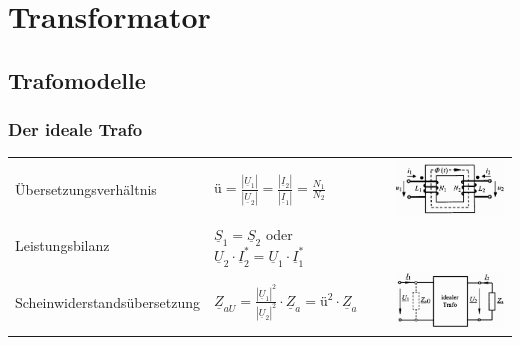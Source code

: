 \section{Transformator}
		
	\subsection{Trafomodelle}
		\subsubsection{Der ideale Trafo}
			\begin{tabular}{p{7cm}p{4.5cm}p{5cm}}
				Übersetzungsverh\"altnis &
					$\text{ü} = \frac{|\underline{U}_1|}{|\underline{U}_2|} =
					\frac{|\underline{I}_2|}{|\underline{I}_1|} = \frac{N_1}{N_2}$ &
					\begin{minipage}{4.5cm}
						\includegraphics[width=3.5cm]{bilder/GrundstruckturTrafo.png}
					\end{minipage} \\
				Leistungsbilanz &
					$\underline{S}_1 = \underline{S}_2$ 
					oder $\underline{U}_2 \cdot \underline{I}_2^* = \underline{U}_1 \cdot \underline{I}_1^*$ \\
				Scheinwiderstandsübersetzung &
					$\underline{Z}_{aU} = \frac{|\underline{U}_1|^2}{|\underline{U}_2|^2} \cdot \underline{Z}_a = \text{ü}^2 \cdot \underline{Z}_a$ &
					\begin{minipage}{4.5cm}
	            		\includegraphics[width=3.5cm]{bilder/IdealerTravoImpedanzwandler.png}
	            	\end{minipage}
			\end{tabular}

